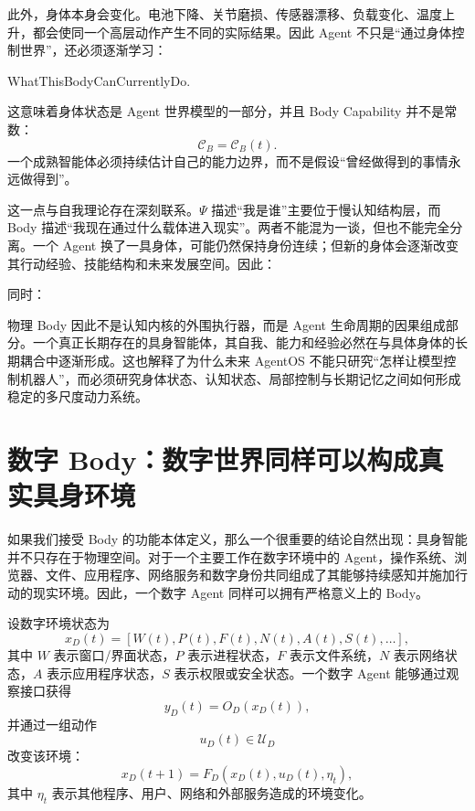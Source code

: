 此外，身体本身会变化。电池下降、关节磨损、传感器漂移、负载变化、温度上升，都会使同一个高层动作产生不同的实际结果。因此 Agent 不只是“通过身体控制世界”，还必须逐渐学习：
\begin{statementbox}
WhatThisBodyCanCurrentlyDo.
\end{statementbox}
这意味着身体状态是 Agent 世界模型的一部分，并且 Body Capability 并不是常数：
\[
\mathcal C_B
=
\mathcal C_B(t).
\]
一个成熟智能体必须持续估计自己的能力边界，而不是假设“曾经做得到的事情永远做得到”。

这一点与自我理论存在深刻联系。$\Psi$ 描述“我是谁”主要位于慢认知结构层，而 Body 描述“我现在通过什么载体进入现实”。两者不能混为一谈，但也不能完全分离。一个 Agent 换了一具身体，可能仍然保持身份连续；但新的身体会逐渐改变其行动经验、技能结构和未来发展空间。因此：
\begin{statementbox}
\centering
{}
\end{statementbox}
同时：
\begin{statementbox}
\centering
{}
\end{statementbox}

物理 Body 因此不是认知内核的外围执行器，而是 Agent 生命周期的因果组成部分。一个真正长期存在的具身智能体，其自我、能力和经验必然在与具体身体的长期耦合中逐渐形成。这也解释了为什么未来 AgentOS 不能只研究“怎样让模型控制机器人”，而必须研究身体状态、认知状态、局部控制与长期记忆之间如何形成稳定的多尺度动力系统。

\section{数字 Body：数字世界同样可以构成真实具身环境}

如果我们接受 Body 的功能本体定义，那么一个很重要的结论自然出现：具身智能并不只存在于物理空间。对于一个主要工作在数字环境中的 Agent，操作系统、浏览器、文件、应用程序、网络服务和数字身份共同组成了其能够持续感知并施加行动的现实环境。因此，一个数字 Agent 同样可以拥有严格意义上的 Body。

设数字环境状态为
\[
x_D(t)
=
[
W(t),
P(t),
F(t),
N(t),
A(t),
S(t),
\ldots
],
\]
其中 $W$ 表示窗口/界面状态，$P$ 表示进程状态，$F$ 表示文件系统，$N$ 表示网络状态，$A$ 表示应用程序状态，$S$ 表示权限或安全状态。一个数字 Agent 能够通过观察接口获得
\[
y_D(t)
=
O_D(x_D(t)),
\]
并通过一组动作
\[
u_D(t)
\in
\mathcal U_D
\]
改变该环境：
\[
x_D(t+1)
=
F_D
\left(
x_D(t),
u_D(t),
\eta_t
\right),
\]
其中 $\eta_t$ 表示其他程序、用户、网络和外部服务造成的环境变化。

